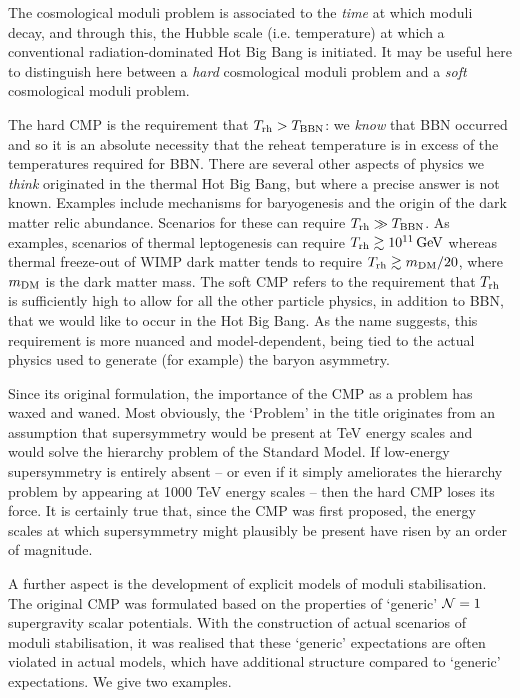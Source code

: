 The cosmological moduli problem is associated to the \emph{time} at which moduli decay, and through this, the Hubble scale (i.e. temperature) at which a conventional radiation-dominated Hot Big Bang is initiated. It may be useful here to distinguish here between a \emph{hard} cosmological moduli problem and a \emph{soft} cosmological moduli problem. 

The hard CMP is the requirement that $T_{\rm rh} > T_{\rm BBN}$: we \emph{know} that BBN occurred and so it is an absolute necessity that the reheat temperature is in excess of the temperatures required for BBN. There are several other aspects of physics we \emph{think} originated in the thermal Hot Big Bang, but where a precise answer is not known. Examples include mechanisms for baryogenesis and 
the origin of the dark matter relic abundance. Scenarios for these can require $T_{\rm rh} \gg T_{\rm BBN}$. As examples, scenarios of thermal leptogenesis can require $T_{\rm rh} \gtrsim 10^{11}\,{\rm GeV}$ \cite{Buchmuller:2005eh} whereas thermal freeze-out of WIMP dark matter tends to require $T_{\rm rh} \gtrsim m_{\rm DM}/20$, where $m_{\rm DM}$ is the dark matter mass. The soft CMP refers to the requirement that $T_{\rm rh}$ is sufficiently high to allow for all the other particle  physics, in addition to BBN, that we would like to occur in the Hot Big Bang. As the name suggests, this requirement is more nuanced and model-dependent, being tied to the actual physics used to generate (for example) the baryon asymmetry.

Since its original formulation, the importance of the CMP as a problem has waxed and waned. Most obviously, the `Problem' in the title originates from an assumption that supersymmetry would be present at TeV energy scales and would solve the hierarchy problem of the Standard Model. If low-energy supersymmetry is entirely absent -- or even if it simply ameliorates the hierarchy problem by appearing at 1000 TeV energy scales -- then the hard CMP loses its force. It is certainly true that, since the CMP was first proposed, the energy scales at which supersymmetry might plausibly be present have risen by an order of magnitude.

A further aspect is the development of explicit models of moduli stabilisation. The original CMP was formulated based on the properties of `generic' ${\cal N}=1$ 
supergravity scalar potentials. With the construction of actual scenarios of moduli stabilisation, it was realised that these `generic' expectations are often violated in actual models, which have additional structure compared to `generic' expectations. We give two examples.

